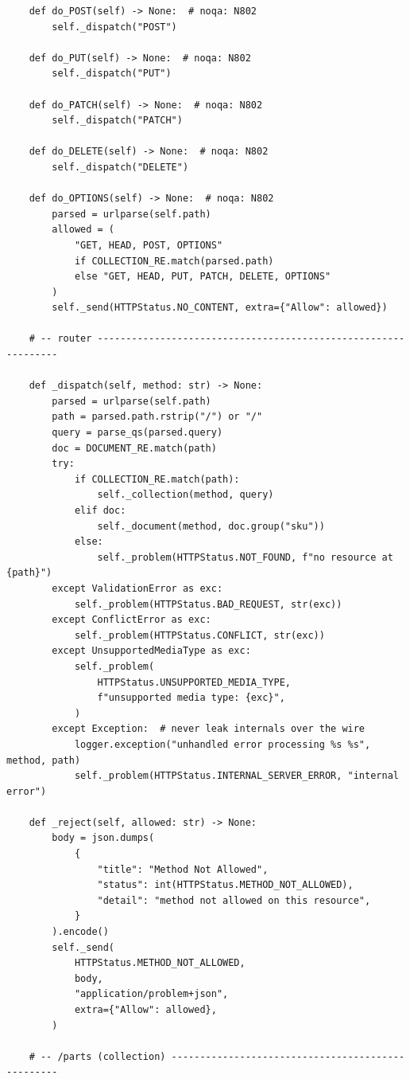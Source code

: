 \begin{verbatim}
    def do_POST(self) -> None:  # noqa: N802
        self._dispatch("POST")

    def do_PUT(self) -> None:  # noqa: N802
        self._dispatch("PUT")

    def do_PATCH(self) -> None:  # noqa: N802
        self._dispatch("PATCH")

    def do_DELETE(self) -> None:  # noqa: N802
        self._dispatch("DELETE")

    def do_OPTIONS(self) -> None:  # noqa: N802
        parsed = urlparse(self.path)
        allowed = (
            "GET, HEAD, POST, OPTIONS"
            if COLLECTION_RE.match(parsed.path)
            else "GET, HEAD, PUT, PATCH, DELETE, OPTIONS"
        )
        self._send(HTTPStatus.NO_CONTENT, extra={"Allow": allowed})

    # -- router ---------------------------------------------------------------

    def _dispatch(self, method: str) -> None:
        parsed = urlparse(self.path)
        path = parsed.path.rstrip("/") or "/"
        query = parse_qs(parsed.query)
        doc = DOCUMENT_RE.match(path)
        try:
            if COLLECTION_RE.match(path):
                self._collection(method, query)
            elif doc:
                self._document(method, doc.group("sku"))
            else:
                self._problem(HTTPStatus.NOT_FOUND, f"no resource at {path}")
        except ValidationError as exc:
            self._problem(HTTPStatus.BAD_REQUEST, str(exc))
        except ConflictError as exc:
            self._problem(HTTPStatus.CONFLICT, str(exc))
        except UnsupportedMediaType as exc:
            self._problem(
                HTTPStatus.UNSUPPORTED_MEDIA_TYPE,
                f"unsupported media type: {exc}",
            )
        except Exception:  # never leak internals over the wire
            logger.exception("unhandled error processing %s %s", method, path)
            self._problem(HTTPStatus.INTERNAL_SERVER_ERROR, "internal error")

    def _reject(self, allowed: str) -> None:
        body = json.dumps(
            {
                "title": "Method Not Allowed",
                "status": int(HTTPStatus.METHOD_NOT_ALLOWED),
                "detail": "method not allowed on this resource",
            }
        ).encode()
        self._send(
            HTTPStatus.METHOD_NOT_ALLOWED,
            body,
            "application/problem+json",
            extra={"Allow": allowed},
        )

    # -- /parts (collection) --------------------------------------------------


\end{verbatim}
